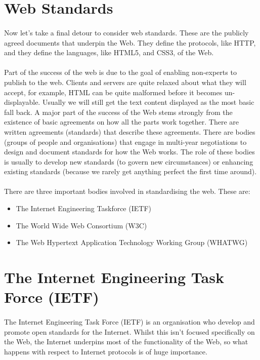 \section{Web Standards}
\paragraph{} Now let's take a final detour to consider web standards. These are the publicly agreed documents that underpin the Web. They define the protocols, like HTTP, and they define the languages, like HTML5, and CSS3, of the Web.
\paragraph{} Part of the success of the web is due to the goal of enabling non-experts to publish to the web. Clients and servers are quite relaxed about what they will accept, for example, HTML can be quite malformed before it becomes un-displayable. Usually we will still get the text content displayed as the most basic fall back. A major part of the success of the Web stems strongly from the existence of basic agreements on how all the parts work together. There are written agreements (standards) that describe these agreements. There are bodies (groups of people and organisations) that engage in multi-year negotiations to design and document standards for how the Web works. The role of these bodies is  usually to develop new standards (to govern new circumstances) or enhancing existing standards (because we rarely get anything perfect the first time around).
\paragraph{} There are three important bodies involved in standardising the web. These are:

\begin{itemize}
\item The Internet Engineering Taskforce (IETF)
\item The World Wide Web Consortium (W3C)
\item The Web Hypertext Application Technology Working Group (WHATWG)
\end{itemize}


\section{The Internet Engineering Task Force (IETF)}
\paragraph{} The Internet Engineering Task Force (IETF) is an organisation who develop and promote open standards for the Internet. Whilst this isn't focused specifically on the Web, the Internet underpins most of the functionality of the Web, so what happens with respect to Internet protocols is of huge importance.
